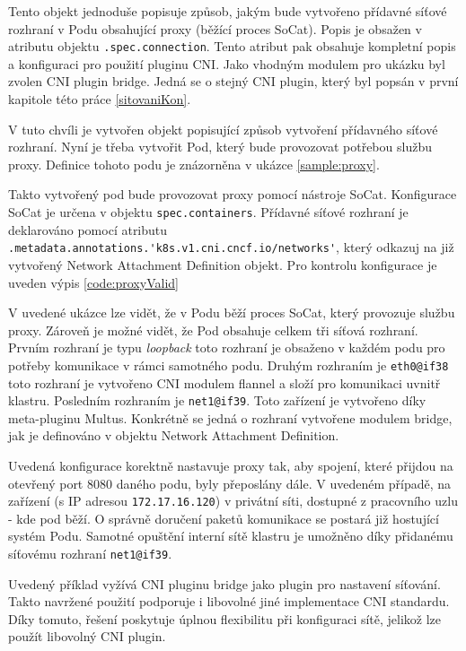 

Tento objekt jednoduše popisuje způsob, jakým bude vytvořeno přídavné síťové rozhraní v Podu obsahující proxy (běžící proces SoCat). Popis je obsažen v atributu objektu \verb|.spec.connection|. Tento atribut pak obsahuje kompletní popis a konfiguraci pro použití  pluginu CNI. Jako vhodným modulem pro ukázku byl zvolen CNI plugin bridge. Jedná se o stejný CNI plugin, který byl popsán v první kapitole této práce \ref{sitovaniKon}.

V tuto chvíli je vytvořen objekt popisující způsob vytvoření přídavného síťové rozhraní. Nyní je třeba vytvořit Pod, který bude provozovat potřebou službu proxy. Definice tohoto podu je znázorněna v ukázce \ref{sample:proxy}.



Takto vytvořený pod bude provozovat proxy pomocí nástroje SoCat. Konfigurace SoCat je určena v objektu \verb|spec.containers|. Přídavné síťové rozhraní je deklarováno pomocí atributu \verb|.metadata.annotations.'k8s.v1.cni.cncf.io/networks'|, který odkazuj na již vytvořený Network Attachment Definition objekt. Pro kontrolu konfigurace je uveden výpis \ref{code:proxyValid}



V uvedené ukázce lze vidět, že v Podu běží proces SoCat, který provozuje službu proxy. Zároveň je možné vidět, že Pod obsahuje celkem tři síťová rozhraní. Prvním rozhraní je typu \textit{loopback} toto rozhraní je obsaženo v každém podu pro potřeby komunikace v rámci samotného podu. Druhým rozhraním je \verb|eth0@if38| toto rozhraní je vytvořeno CNI modulem flannel a složí pro komunikaci uvnitř klastru. Posledním rozhraním je \verb|net1@if39|. Toto zařízení je vytvořeno díky meta-pluginu Multus. Konkrétně se jedná o  rozhraní vytvořene  modulem bridge, jak je definováno v objektu Network Attachment Definition.

Uvedená konfigurace korektně nastavuje proxy tak, aby spojení, které přijdou na otevřený port 8080 daného podu, byly přeposlány dále. V uvedeném případě, na zařízení (s IP adresou \verb|172.17.16.120|) v privátní síti, dostupné z pracovního uzlu - kde pod běží. O správně doručení paketů komunikace se postará již hostující systém Podu. Samotné opuštění interní sítě klastru je umožněno díky přidanému síťovému rozhraní \verb|net1@if39|.

Uvedený příklad vyžívá CNI pluginu bridge jako plugin pro nastavení síťování. Takto navržené použití podporuje i libovolné jiné implementace CNI standardu. Díky tomuto, řešení poskytuje úplnou flexibilitu při konfiguraci sítě, jelikož lze použít libovolný CNI plugin.

